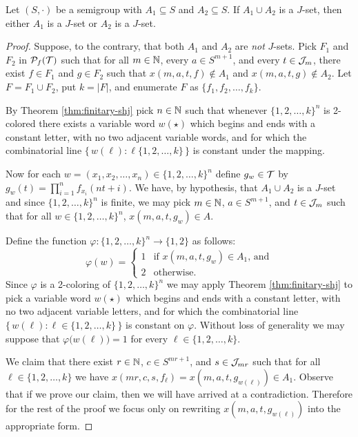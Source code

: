 \begin{lem}
  \label{lem:pr-jsets}
  Let $(S, \cdot)$ be a semigroup with $A_1 \subseteq S$ and $A_2 \subseteq S$.
  If $A_1 \cup A_2$ is a $J$-set, then either $A_1$ is a $J$-set or $A_2$ is a $J$-set.
\end{lem}
\begin{proof}
  Suppose, to the contrary, that both $A_1$ and $A_2$ are \emph{not} $J$-sets.
  Pick $F_1$ and $F_2$ in $\mathcal{P}_f(\mathcal{T})$ such that for all $m \in \mathbb{N}$, every $a \in S^{m+1}$, and every $t \in \mathcal{J}_m$, there exist $f \in F_1$ and $g \in F_2$ such that $x(m, a, t, f) \not\in A_1$ and $x(m, a, t, g) \not\in A_2$.
  Let $F = F_1 \cup F_2$, put $k = |F|$, and enumerate $F$ as $\{f_1, f_2, \ldots, f_k\}$.

  By Theorem \ref{thm:finitary-shj} pick $n \in \mathbb{N}$ such that whenever $\{1, 2, \ldots, k\}^n$ is 2-colored there exists a variable word $w(\star)$ which begins and ends with a constant letter, with no two adjacent variable words, and for which the combinatorial line $\bigl\{\, w(\ell) : \ell \{1, 2, \ldots, k\} \,\bigr\}$ is constant under the mapping. 

  Now for each $w = (x_1, x_2, \ldots, x_n) \in \{1, 2, \ldots, k\}^n$ define $g_w \in \mathcal{T}$ by $g_w(t) = \prod_{i=1}^n f_{x_i}(nt + i)$.
  We have, by hypothesis, that $A_1 \cup A_2$ is a $J$-set and since $\{1, 2, \ldots, k\}^n$ is finite, we may pick $m \in \mathbb{N}$, $a \in S^{m+1}$, and $t \in \mathcal{J}_m$ such that for all $w \in \{1, 2, \ldots, k\}^n$, $x(m, a, t, g_w) \in A$.

  Define the function $\varphi \colon \{1, 2, \ldots, k\}^n \to \{1, 2\}$ as follows:
  \[
    \varphi(w) = 
    \begin{cases}
      1 & \mbox{if $x(m, a, t, g_w) \in A_1$, and} \\
      2 & \mbox{otherwise.}
    \end{cases}
  \]
  Since $\varphi$ is a 2-coloring of $\{1, 2, \ldots, k\}^n$ we may apply Theorem \ref{thm:finitary-shj} to pick a variable word $w(\star)$ which begins and ends with a constant letter, with no two adjacent variable letters, and for which the combinatorial line $\bigl\{\, w(\ell) : \ell \in \{1, 2, \ldots, k\} \,\bigr\}$ is constant on $\varphi$. 
  Without loss of generality we may suppose that $\varphi \bigl( w(\ell) \bigr) = 1$ for every $\ell \in \{1, 2, \ldots, k\}$.

  We claim that there exist $r \in \mathbb{N}$, $c \in S^{mr+1}$, and $s \in \mathcal{J}_{mr}$ such that for all $\ell \in \{1, 2, \ldots, k\}$ we have $x(mr, c, s, f_\ell) = x(m, a, t, g_{w(\ell)}) \in A_1$. 
  Observe that if we prove our claim, then we will have arrived at a contradiction. 
  Therefore for the rest of the proof we focus only on rewriting $x(m, a, t, g_{w(\ell)})$ into the appropriate form.


\end{proof}
